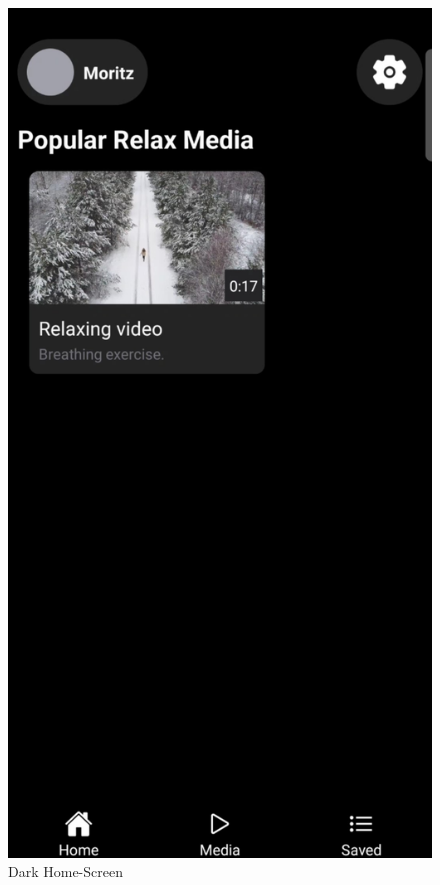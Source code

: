\begin{figure}[H]
    \begin{minipage}{0.5\textwidth}
        \centering
        \includegraphics[height=1.4\textwidth]{./pics/dHome.jpg}
        \caption{Dark Home-Screen}
    \end{minipage}
    \begin{minipage}{0.5\textwidth}
        \centering

\end{minipage}
\end{figure}
